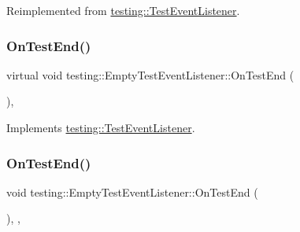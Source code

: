 Reimplemented from \mbox{\hyperlink{classtesting_1_1_test_event_listener_ac48628c9f78d3e10bff77c7366e9e780}{testing\+::\+Test\+Event\+Listener}}.

\mbox{\label{classtesting_1_1_empty_test_event_listener_afd58d21005f0d0d0399fb114627545d3}} 
\subsubsection{\texorpdfstring{OnTestEnd()}{OnTestEnd()}\hspace{0.1cm}{\footnotesize\ttfamily [1/3]}}
{\footnotesize\ttfamily virtual void testing\+::\+Empty\+Test\+Event\+Listener\+::\+On\+Test\+End (\begin{DoxyParamCaption}\item[{const \mbox{\hyperlink{classtesting_1_1_test_info}{Test\+Info}} \&}]{ }\end{DoxyParamCaption})\hspace{0.3cm}{\ttfamily [inline]}, {\ttfamily [virtual]}}



Implements \mbox{\hyperlink{classtesting_1_1_test_event_listener_abb1c44525ef038500608b5dc2f17099b}{testing\+::\+Test\+Event\+Listener}}.

\mbox{\label{classtesting_1_1_empty_test_event_listener_a709d7077c086c877d214231bc520ef90}} 
\subsubsection{\texorpdfstring{OnTestEnd()}{OnTestEnd()}\hspace{0.1cm}{\footnotesize\ttfamily [2/3]}}
{\footnotesize\ttfamily void testing\+::\+Empty\+Test\+Event\+Listener\+::\+On\+Test\+End (\begin{DoxyParamCaption}\item[{const \mbox{\hyperlink{classtesting_1_1_test_info}{Test\+Info}} \&}]{ }\end{DoxyParamCaption})\hspace{0.3cm}{\ttfamily [inline]}, {\ttfamily [override]}, {\ttfamily [virtual]}}



